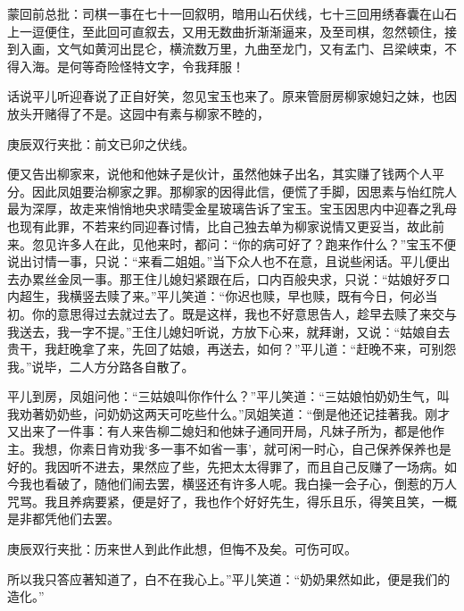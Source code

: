 \begin{parag}

    \begin{note}蒙回前总批：司棋一事在七十一回叙明，暗用山石伏线，七十三回用绣春囊在山石上一逗便住，至此回可直叙去，又用无数曲折渐渐逼来，及至司棋，忽然顿住，接到入画，文气如黄河出昆仑，横流数万里，九曲至龙门，又有孟门、吕梁峡束，不得入海。是何等奇险怪特文字，令我拜服！\end{note}
\end{parag}

\begin{parag}

    话说平儿听迎春说了正自好笑，忽见宝玉也来了。原来管厨房柳家媳妇之妹，也因放头开赌得了不是。这园中有素与柳家不睦的，\begin{note}庚辰双行夹批：前文已卯之伏线。\end{note}便又告出柳家来，说他和他妹子是伙计，虽然他妹子出名，其实赚了钱两个人平分。因此凤姐要治柳家之罪。那柳家的因得此信，便慌了手脚，因思素与怡红院人最为深厚，故走来悄悄地央求晴雯金星玻璃告诉了宝玉。宝玉因思内中迎春之乳母也现有此罪，不若来约同迎春讨情，比自己独去单为柳家说情又更妥当，故此前来。忽见许多人在此，见他来时，都问：“你的病可好了？跑来作什么？”宝玉不便说出讨情一事，只说：“来看二姐姐。”当下众人也不在意，且说些闲话。平儿便出去办累丝金凤一事。那王住儿媳妇紧跟在后，口内百般央求，只说：“姑娘好歹口内超生，我横竖去赎了来。”平儿笑道：“你迟也赎，早也赎，既有今日，何必当初。你的意思得过去就过去了。既是这样，我也不好意思告人，趁早去赎了来交与我送去，我一字不提。”王住儿媳妇听说，方放下心来，就拜谢，又说：“姑娘自去贵干，我赶晚拿了来，先回了姑娘，再送去，如何？”平儿道：“赶晚不来，可别怨我。”说毕，二人方分路各自散了。
\end{parag}


\begin{parag}


    平儿到房，凤姐问他：“三姑娘叫你作什么？”平儿笑道：“三姑娘怕奶奶生气，叫我劝著奶奶些，问奶奶这两天可吃些什么。”凤姐笑道：“倒是他还记挂著我。刚才又出来了一件事：有人来告柳二媳妇和他妹子通同开局，凡妹子所为，都是他作主。我想，你素日肯劝我‘多一事不如省一事’，就可闲一时心，自己保养保养也是好的。我因听不进去，果然应了些，先把太太得罪了，而且自己反赚了一场病。如今我也看破了，随他们闹去罢，横竖还有许多人呢。我白操一会子心，倒惹的万人咒骂。我且养病要紧，便是好了，我也作个好好先生，得乐且乐，得笑且笑，一概是非都凭他们去罢。\begin{note}庚辰双行夹批：历来世人到此作此想，但悔不及矣。可伤可叹。\end{note}所以我只答应著知道了，白不在我心上。”平儿笑道：“奶奶果然如此，便是我们的造化。”
\end{parag}


